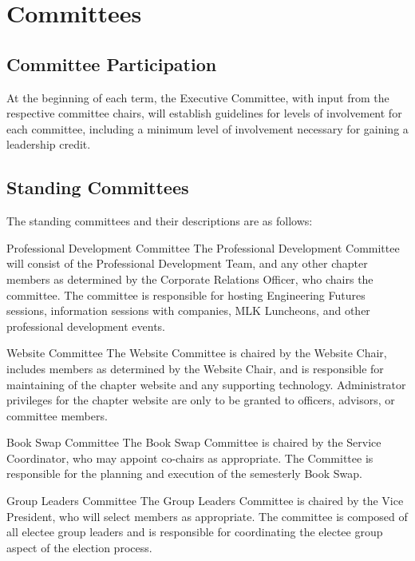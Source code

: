 \chapter{Committees}\label{sec:committees}%
\section{Committee Participation}\label{sec:commPart} At the beginning of each term, the Executive Committee, with input from the respective committee chairs, will establish guidelines for levels of involvement for each committee, including a minimum level of involvement necessary for gaining a leadership credit.
\section{Standing Committees}\label{sec:standingCommittees} The standing committees and their descriptions are as follows:
\begin{enumsubsection}
	\item{Professional Development Committee} The Professional Development Committee will consist of the Professional Development Team, and any other chapter members as determined by the Corporate Relations Officer, who chairs the committee. The committee is responsible for hosting Engineering Futures sessions, information sessions with companies, MLK Luncheons, and other professional development events.
	\item{Website Committee} The Website Committee is chaired by the Website Chair, includes members as determined by the Website Chair, and is responsible for maintaining of the chapter website and any supporting technology. Administrator privileges for the chapter website are only to be granted to officers, advisors, or committee members.
	\item{Book Swap Committee} The Book Swap Committee is chaired by the Service Coordinator, who may appoint co-chairs as appropriate. The Committee is responsible for the planning and execution of the semesterly Book Swap.
	\item{Group Leaders Committee} The Group Leaders Committee is chaired by the Vice President, who will select members as appropriate. The committee is composed of all electee group leaders and is responsible for coordinating the electee group aspect of the election process.
\end{enumsubsection}

